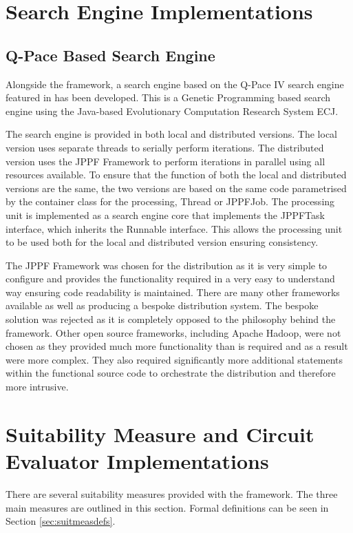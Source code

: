 \section{Search Engine Implementations}
\label{sec:provsearcheng}
\subsection{Q-Pace Based Search Engine}
Alongside the framework, a search engine based on the Q-Pace IV search engine featured in \cite{masseythesis} has been developed.
This is a Genetic Programming based search engine using the Java-based Evolutionary Computation Research System ECJ\cite{ecjtool}.

The search engine is provided in both local and distributed versions.
The local version uses separate threads to serially perform iterations.
The distributed version uses the JPPF Framework to perform iterations in parallel using all resources available.
To ensure that the function of both the local and distributed versions are the same, the two versions are based on the same code parametrised by the container class for the processing, Thread or JPPFJob.
The processing unit is implemented as a search engine core that implements the JPPFTask interface, which inherits the Runnable interface.
This allows the processing unit to be used both for the local and distributed version ensuring consistency.

The JPPF Framework was chosen for the distribution as it is very simple to configure and provides the functionality required in a very easy to understand way ensuring code readability is maintained.
There are many other frameworks available as well as producing a bespoke distribution system.
The bespoke solution was rejected as it is completely opposed to the philosophy behind the framework.
Other open source frameworks, including Apache Hadoop\cite{apahadoop}, were not chosen as they provided much more functionality than is required and as a result were more complex.
They also required significantly more additional statements within the functional source code to orchestrate the distribution and therefore more intrusive.

\section{Suitability Measure and Circuit Evaluator Implementations}
\label{sec:provsuitmeas}

There are several suitability measures provided with the framework.
The three main measures are outlined in this section.
Formal definitions can be seen in Section \ref{sec:suitmeasdefs}.

